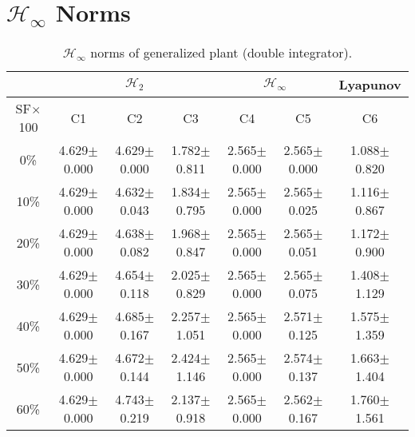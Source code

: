 \section{$\mathcal{H}_{\infty}$ Norms}
\begin{table}[H]
\centering
\scriptsize
\begin{tabular}{| c || c | c | c | c | c | c |}
	\hline
	 & \multicolumn{3}{c|}{$\mathcal{H}_{2}$} & \multicolumn{2}{c|}{$\mathcal{H}_{\infty}$} & Lyapunov\\
	\hline
	SF$\times$100 & C1& C2 & C3 & C4 & C5 & C6\\
	\hline\hline
	0\% & 4.629$\pm$0.000 & 4.629$\pm$0.000 & 1.782$\pm$0.811 & 2.565$\pm$0.000 & 2.565$\pm$0.000 & 1.088$\pm$0.820\\
	\hline
	10\% & 4.629$\pm$0.000 & 4.632$\pm$0.043 & 1.834$\pm$0.795 & 2.565$\pm$0.000 & 2.565$\pm$0.025 & 1.116$\pm$0.867\\
	\hline
	20\% & 4.629$\pm$0.000 & 4.638$\pm$0.082 & 1.968$\pm$0.847 & 2.565$\pm$0.000 & 2.565$\pm$0.051 & 1.172$\pm$0.900\\
	\hline
	30\% & 4.629$\pm$0.000 & 4.654$\pm$0.118 & 2.025$\pm$0.829 & 2.565$\pm$0.000 & 2.565$\pm$0.075 & 1.408$\pm$1.129\\
	\hline
	40\% & 4.629$\pm$0.000 & 4.685$\pm$0.167 & 2.257$\pm$1.051 & 2.565$\pm$0.000 & 2.571$\pm$0.125 & 1.575$\pm$1.359\\
	\hline
	50\% & 4.629$\pm$0.000 & 4.672$\pm$0.144 & 2.424$\pm$1.146 & 2.565$\pm$0.000 & 2.574$\pm$0.137 & 1.663$\pm$1.404\\
	\hline
	60\% & 4.629$\pm$0.000 & 4.743$\pm$0.219 & 2.137$\pm$0.918 & 2.565$\pm$0.000 & 2.562$\pm$0.167 & 1.760$\pm$1.561\\
	\hline
\end{tabular}
\caption{$\mathcal{H}_{\infty}$ norms of generalized plant (double integrator).}
\label{table:hinfinity_norms_double_integrator:unc}
\end{table}

